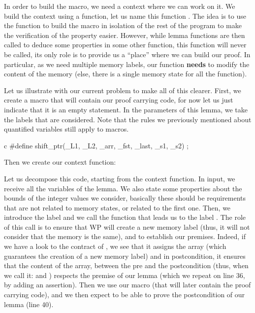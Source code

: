 In order to build the macro, we need a context where we can work on it. We build
the context using a function, let us name this function
. The idea is to use the function to
build the macro in isolation of the rest of the program to make the verification
of the property easier. However, while lemma functions are then called to deduce
some properties in some other function, this function will never be called, its
only role is to provide us a ``place'' where we can build our proof. In
particular, as we need multiple memory labels, our function \textbf{needs} to
modify the content of the memory (else, there is a single memory state for all
the function).



Let us illustrate with our current problem to make all of this clearer. First,
we create a macro  that will contain our proof carrying
code, for now let us just indicate that it is an empty statement. In the
parameters of this lemma, we take the labels that are considered. Note that the
rules we previously mentioned about quantified variables still apply to macros.


\begin{CodeBlock}{c}
#define shift_ptr(_L1, _L2, _arr, _fst, _last, _s1, _s2) ;
\end{CodeBlock}


Then we create our context function:




Let us decompose this code, starting from the context function. In input, we
receive all the variables of the lemma. We also state some properties about the
bounds of the integer values we consider, basically these should be requirements
that are not related to memory states, or related to the first one. Then, we
introduce the label
 and we call the function  that leads
us to the label . The role of this call is to ensure that WP will
create a new memory label (thus, it will not consider that the memory is the
same), and to establish our premises. Indeed, if we have a look to the contract
of , we see that it assigns the array (which
guarantees the creation of a new memory label) and in postcondition, it ensures
that the content of the array, between the pre and the postcondition (thus, when
we call it:  and ) respects the premise of our
lemma (which we repeat on line 36, by adding an assertion). Then we use our
 macro (that will later contain the proof carrying code),
and we then expect to be able to prove the postcondition of our lemma (line 40).



